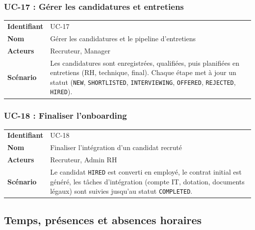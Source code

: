 \documentclass[a4paper,12pt,openany]{book}
\begin{document}
    \subsubsection*{UC-17 : Gérer les candidatures et entretiens}
    \begin{table}[H]
        \centering
        \begin{tabularx}{\textwidth}{lX}
    \toprule
    \textbf{Identifiant} & UC-17 \\
    \textbf{Nom}         & Gérer les candidatures et le pipeline d'entretiens \\
    \textbf{Acteurs}     & Recruteur, Manager \\
    \midrule
    \textbf{Scénario} & Les candidatures sont enregistrées, qualifiées, puis planifiées en entretiens (RH, technique, final). Chaque étape met à jour un statut (\texttt{NEW}, \texttt{SHORTLISTED}, \texttt{INTERVIEWING}, \texttt{OFFERED}, \texttt{REJECTED}, \texttt{HIRED}). \\
    \bottomrule
        \end{tabularx}
    \end{table}

    \subsubsection*{UC-18 : Finaliser l'onboarding}
    \begin{table}[H]
        \centering
        \begin{tabularx}{\textwidth}{lX}
    \toprule
    \textbf{Identifiant} & UC-18 \\
    \textbf{Nom}         & Finaliser l'intégration d'un candidat recruté \\
    \textbf{Acteurs}     & Recruteur, Admin RH \\
    \midrule
    \textbf{Scénario} & Le candidat \texttt{HIRED} est converti en employé, le contrat initial est généré, les tâches d'intégration (compte IT, dotation, documents légaux) sont suivies jusqu'au statut \texttt{COMPLETED}. \\
    \bottomrule
        \end{tabularx}
    \end{table}


    \subsection{Temps, présences et absences horaires}
\end{document}
